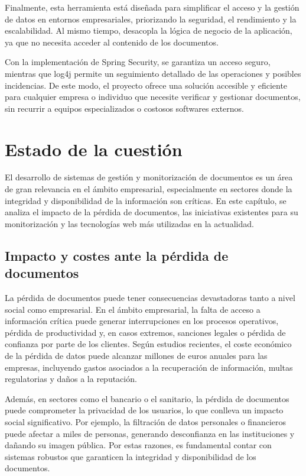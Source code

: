 \documentclass[draft]{scrbook}
\begin{document}
Finalmente, esta herramienta está diseñada para simplificar el acceso y la gestión de datos en entornos empresariales, priorizando la seguridad, el rendimiento y la escalabilidad. Al mismo tiempo, desacopla la lógica de negocio de la aplicación, ya que no necesita acceder al contenido de los documentos. 

Con la implementación de Spring Security, se garantiza un acceso seguro, mientras que log4j permite un seguimiento detallado de las operaciones y posibles incidencias. De este modo, el proyecto ofrece una solución accesible y eficiente para cualquier empresa o individuo que necesite verificar y gestionar documentos, sin recurrir a equipos especializados o costosos softwares externos.


\chapter{Estado de la cuestión}
El desarrollo de sistemas de gestión y monitorización de documentos es un área de gran relevancia en el ámbito empresarial, especialmente en sectores donde la integridad y disponibilidad de la información son críticas. En este capítulo, se analiza el impacto de la pérdida de documentos, las iniciativas existentes para su monitorización y las tecnologías web más utilizadas en la actualidad.

\section{Impacto y costes ante la pérdida de documentos}
La pérdida de documentos puede tener consecuencias devastadoras tanto a nivel social como empresarial. En el ámbito empresarial, la falta de acceso a información crítica puede generar interrupciones en los procesos operativos, pérdida de productividad y, en casos extremos, sanciones legales o pérdida de confianza por parte de los clientes.  Según estudios recientes, el coste económico de la pérdida de datos puede alcanzar millones de euros anuales para las empresas, incluyendo gastos asociados a la recuperación de información, multas regulatorias y daños a la reputación.

Además, en sectores como el bancario o el sanitario, la pérdida de documentos puede comprometer la privacidad de los usuarios, lo que conlleva un impacto social significativo. Por ejemplo, la filtración de datos personales o financieros puede afectar a miles de personas, generando desconfianza en las instituciones y dañando su imagen pública. Por estas razones, es fundamental contar con sistemas robustos que garanticen la integridad y disponibilidad de los documentos.
\end{document}
